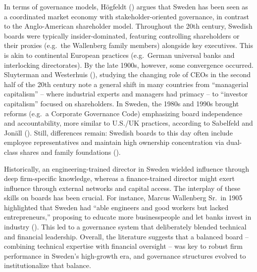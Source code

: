 \documentclass[
]{article}
\begin{document}
In terms of governance models, Högfeldt
() argues that
Sweden has been seen as a coordinated market economy with
stakeholder-oriented governance, in contrast to the Anglo-American
shareholder model. Throughout the 20th century, Swedish boards were
typically insider-dominated, featuring controlling shareholders or their
proxies (e.g.~the Wallenberg family members) alongside key executives.
This is akin to continental European practices (e.g.~German universal
banks and interlocking directorates)\hspace{0pt}. By the late 1900s,
however, some convergence occurred. Sluyterman and Westerhuis
(), studying the
changing role of CEOs in the second half of the 20th century note a
general shift in many countries from ``managerial capitalism'' -- where
industrial experts and managers had primacy -- to ``investor
capitalism'' focused on shareholders\hspace{0pt}. In Sweden, the 1980s
and 1990s brought reforms (e.g.~a Corporate Governance Code) emphasizing
board independence and accountability, more similar to U.S./UK
practices\hspace{0pt}, according to Sabelfeld and Jonäll
(). Still,
differences remain: Swedish boards to this day often include employee
representatives and maintain high ownership concentration via dual-class
shares and family foundations\hspace{0pt}
().

Historically, an engineering-trained director in Sweden wielded
influence through deep firm-specific knowledge, whereas a
finance-trained director might exert influence through external networks
and capital access. The interplay of these skills on boards has been
crucial. For instance, Marcus Wallenberg Sr.~in 1905 highlighted that
Sweden had ``able engineers and good workers but lacked entrepreneurs,''
proposing to educate more businesspeople and let banks invest in
industry\hspace{0pt}
().
This led to a governance system that deliberately blended technical and
financial leadership. Overall, the literature suggests that a balanced
board -- combining technical expertise with financial oversight -- was
key to robust firm performance in Sweden's high-growth era, and
governance structures evolved to institutionalize that balance.
\end{document}
